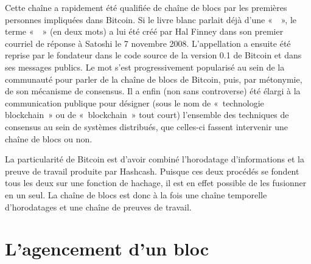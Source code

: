 Cette chaîne a rapidement été qualifiée de chaîne de blocs par les premières personnes impliquées dans Bitcoin. Si le livre blanc parlait déjà d'une «~~», le terme «~~» (en deux mots) a lui été créé par Hal Finney dans son premier courriel de réponse à Satoshi le 7 novembre 2008. L'appellation a ensuite été reprise par le fondateur dans le code source de la version 0.1 de Bitcoin et dans ses messages publics. Le mot  s'est progressivement popularisé au sein de la communauté pour parler de la chaîne de blocs de Bitcoin, puis, par métonymie, de son mécanisme de consensus. Il a enfin (non sans controverse) été élargi à la communication publique pour désigner (sous le nom de «~technologie blockchain~» ou de «~blockchain~» tout court) l'ensemble des techniques de consensus au sein de systèmes distribués, que celles-ci fassent intervenir une chaîne de blocs ou non.

La particularité de Bitcoin est d'avoir combiné l'horodatage d'informations et la preuve de travail produite par Hashcash. Puisque ces deux procédés se fondent tous les deux sur une fonction de hachage, il est en effet possible de les fusionner en un seul. La chaîne de blocs est donc à la fois une chaîne temporelle d'horodatages et une chaîne de preuves de travail.

\vspace{-1em}
\section*{L'agencement d'un bloc} %


